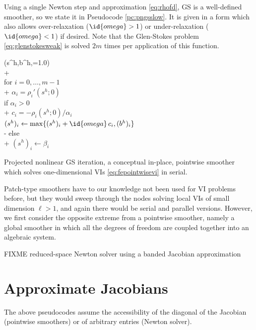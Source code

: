 \documentclass[letterpaper,final,12pt,reqno]{amsart}
\theoremstyle{claim}
\numberwithin{equation}{section}
\numberwithin{figure}{section}
\numberwithin{table}{section}
\numberwithin{theorem}{section}
\begin{document}
Using a single Newton step and approximation \eqref{eq:rhofd}, GS is a well-defined smoother, so we state it in Pseudocode \ref{pc:pngsslow}.  It is given in a form which also allows over-relaxation ($\id{omega} > 1$) or under-relaxation ($\id{omega} < 1$) if desired.  Note that the Glen-Stokes problem \eqref{eq:glenstokesweak} is solved $2m$ times per application of this function.

\begin{pcode}[ht]
\begin{pseudo*}
(s^h,b^h,=1.0)\text{:} \\+
     \\
    for $i = 0,\dots,m-1$ \\+
        $\alpha_i = \rho_i'(s^h; 0)$  \qquad\qquad {} \\
        if $\alpha_i > 0$ \\+
            $c_i = - \rho_i(s^h; 0) / \alpha_i$ \\
            $(s^h)_i \gets \max\{(s^h)_i + \id{omega}\,c_i, (b^h)_i\}$ \\-
        else \\+
            $(s^h)_i \gets \beta_i$ \qquad\qquad {}
\end{pseudo*}
\caption{Projected nonlinear GS iteration, a conceptual in-place, pointwise smoother which solves one-dimensional VIs \eqref{eq:fepointwisevi} in serial.}
\label{pc:pngsslow}
\end{pcode}

Patch-type smoothers \cite{Farrelletal2019} have to our knowledge not been used for VI problems before, but they would sweep through the nodes solving local VIs of small dimension $\ell>1$, and again there would be serial and parallel versions.  However, we first consider the opposite extreme from a pointwise smoother, namely a global smoother in which all the degrees of freedom are coupled together into an algebraic system.

FIXME reduced-space Newton solver using a banded Jacobian approximation


\section{Approximate Jacobians} \label{sec:jacobians}

The above pseudocodes assume the accessibility of the diagonal of the Jacobian (pointwise smoothers) or of arbitrary entries (Newton solver).
\end{document}
